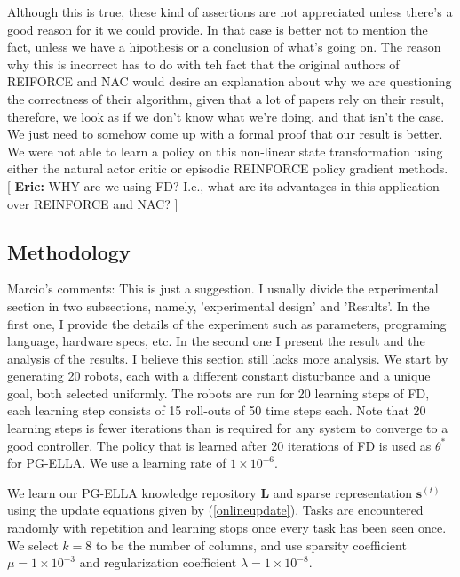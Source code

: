 \documentclass{aamas2016}
\newcommand{\note}[3]{{\color{#2} [ \ding{42} \textbf{#1:} {\small #3} ]}}
\newcommand{\comEric}[1]{\note{Eric}{blue}{#1}}
\begin{document}
{\color{red} Although this is true, these kind of assertions are not appreciated unless there's a good reason for it we could provide. In that
case is better not to mention the fact, unless we have a hipothesis or a conclusion of what's going on. The reason why this is incorrect has
to do with teh fact that the original authors of REIFORCE and NAC would desire an explanation about why we are questioning the correctness
of their algorithm, given that a lot of papers rely on their result, therefore, we look as if we don't know what we're doing, and
that isn't the case. We just need to somehow come up with a formal proof that our result is better.}
We were not able to learn a policy on this non-linear state transformation using either the natural actor critic \cite{peters2008natural} or episodic REINFORCE \cite{williams1992simple} policy gradient methods.   
\comEric{WHY are we using FD?  I.e., what are its advantages in this application over REINFORCE and NAC?}

\subsection{Methodology}
{\color{red} Marcio's comments: This is just a suggestion. I usually divide the experimental section in two subsections, namely,
'experimental design' and 'Results'. In the first one, I provide the details of the experiment such as parameters, programing language, hardware
specs, etc. In the second one I present the result and the analysis of the results. I believe this section still lacks more analysis.}
We start by generating 20 robots, each with a different constant disturbance and a unique goal, both selected uniformly. The robots are run for 20 learning steps of FD, each learning step consists of 15 roll-outs of 50 time steps each. Note that 20 learning steps is fewer iterations than is required for any system to converge to a good controller. The policy that is learned after 20 iterations of FD is used as $\theta^*$ for PG-ELLA. We use a learning rate of $1\times 10^{-6}$.

We learn our PG-ELLA knowledge repository $\bm{L}$ and sparse representation $\bm{s}^{(t)}$ using the update equations given 
by (\ref{onlineupdate}). Tasks are encountered randomly with repetition and learning stops once every task has been seen 
once. We select $k=8$ to be the number of columns, and use sparsity coefficient $\mu = 1\times 10^{-3}$ and regularization coefficient $\lambda = 1\times 10^{-8}$.
\end{document}
